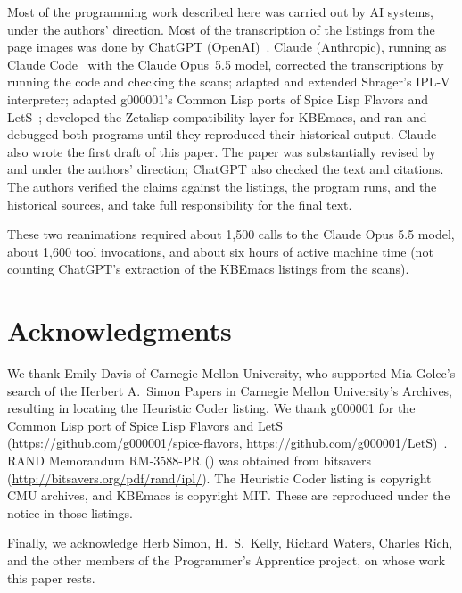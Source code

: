 \documentclass[11pt]{article}
\begin{document}
Most of the programming work described here was carried out by AI
systems, under the authors' direction. Most of the transcription of
the listings from the page images was done by ChatGPT
(OpenAI)~\cite{chatgpt}. Claude (Anthropic), running as Claude
Code~\cite{claude} with the Claude Opus~5.5 model, corrected the
transcriptions by running the code and checking the scans; adapted and
extended Shrager's IPL-V interpreter; adapted g000001's Common Lisp
ports of Spice Lisp Flavors and LetS~\cite{g000001}; developed the
Zetalisp compatibility layer for KBEmacs, and ran and debugged both
programs until they reproduced their historical output. Claude also
wrote the first draft of this paper. The paper was substantially
revised by and under the authors' direction; ChatGPT also checked the
text and citations. The authors verified the claims against the
listings, the program runs, and the historical sources, and take full
responsibility for the final text.

These two reanimations required about 1,500 calls to the Claude Opus
5.5 model, about 1,600 tool invocations, and about six hours of active
machine time (not counting ChatGPT's extraction of the KBEmacs
listings from the scans).

\section*{Acknowledgments}

We thank Emily Davis of Carnegie Mellon University, who supported Mia
Golec's search of the Herbert A.~Simon Papers in Carnegie Mellon
University's Archives, resulting in locating the Heuristic Coder
listing. We thank g000001 for the Common Lisp port of Spice Lisp
Flavors and LetS (\url{https://github.com/g000001/spice-flavors},
\url{https://github.com/g000001/LetS})~\cite{g000001}. RAND Memorandum
RM-3588-PR (\cite{simonRM3588}) was obtained from bitsavers
(\url{http://bitsavers.org/pdf/rand/ipl/}). The Heuristic Coder
listing is copyright CMU archives, and KBEmacs is copyright MIT. These
are reproduced under the notice in those listings.

Finally, we acknowledge Herb Simon, H.~S.~Kelly, Richard Waters,
Charles Rich, and the other members of the Programmer's Apprentice
project, on whose work this paper rests.
\end{document}

